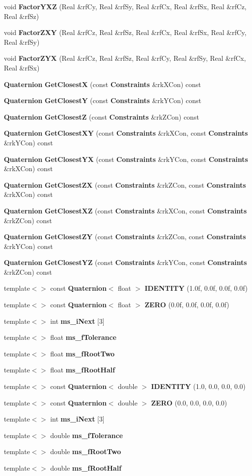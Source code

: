 \begin{CompactItemize}
\item 
void {\bf Factor\-YXZ} (Real \&rf\-Cy, Real \&rf\-Sy, Real \&rf\-Cx, Real \&rf\-Sx, Real \&rf\-Cz, Real \&rf\-Sz)
\item 
void {\bf Factor\-ZXY} (Real \&rf\-Cz, Real \&rf\-Sz, Real \&rf\-Cx, Real \&rf\-Sx, Real \&rf\-Cy, Real \&rf\-Sy)
\item 
void {\bf Factor\-ZYX} (Real \&rf\-Cz, Real \&rf\-Sz, Real \&rf\-Cy, Real \&rf\-Sy, Real \&rf\-Cx, Real \&rf\-Sx)
\item 
{\bf Quaternion} {\bf Get\-Closest\-X} (const {\bf Constraints} \&rk\-XCon) const
\item 
{\bf Quaternion} {\bf Get\-Closest\-Y} (const {\bf Constraints} \&rk\-YCon) const
\item 
{\bf Quaternion} {\bf Get\-Closest\-Z} (const {\bf Constraints} \&rk\-ZCon) const
\item 
{\bf Quaternion} {\bf Get\-Closest\-XY} (const {\bf Constraints} \&rk\-XCon, const {\bf Constraints} \&rk\-YCon) const
\item 
{\bf Quaternion} {\bf Get\-Closest\-YX} (const {\bf Constraints} \&rk\-YCon, const {\bf Constraints} \&rk\-XCon) const
\item 
{\bf Quaternion} {\bf Get\-Closest\-ZX} (const {\bf Constraints} \&rk\-ZCon, const {\bf Constraints} \&rk\-XCon) const
\item 
{\bf Quaternion} {\bf Get\-Closest\-XZ} (const {\bf Constraints} \&rk\-XCon, const {\bf Constraints} \&rk\-ZCon) const
\item 
{\bf Quaternion} {\bf Get\-Closest\-ZY} (const {\bf Constraints} \&rk\-ZCon, const {\bf Constraints} \&rk\-YCon) const
\item 
{\bf Quaternion} {\bf Get\-Closest\-YZ} (const {\bf Constraints} \&rk\-YCon, const {\bf Constraints} \&rk\-ZCon) const
\item 
template$<$$>$ const {\bf Quaternion}$<$ float $>$ {\bf IDENTITY} (1.0f, 0.0f, 0.0f, 0.0f)
\item 
template$<$$>$ const {\bf Quaternion}$<$ float $>$ {\bf ZERO} (0.0f, 0.0f, 0.0f, 0.0f)
\item 
template$<$$>$ int {\bf ms\_\-i\-Next} [3]
\item 
template$<$$>$ float {\bf ms\_\-f\-Tolerance}
\item 
template$<$$>$ float {\bf ms\_\-f\-Root\-Two}
\item 
template$<$$>$ float {\bf ms\_\-f\-Root\-Half}
\item 
template$<$$>$ const {\bf Quaternion}$<$ double $>$ {\bf IDENTITY} (1.0, 0.0, 0.0, 0.0)
\item 
template$<$$>$ const {\bf Quaternion}$<$ double $>$ {\bf ZERO} (0.0, 0.0, 0.0, 0.0)
\item 
template$<$$>$ int {\bf ms\_\-i\-Next} [3]
\item 
template$<$$>$ double {\bf ms\_\-f\-Tolerance}
\item 
template$<$$>$ double {\bf ms\_\-f\-Root\-Two}
\item 
template$<$$>$ double {\bf ms\_\-f\-Root\-Half}
\end{CompactItemize}
